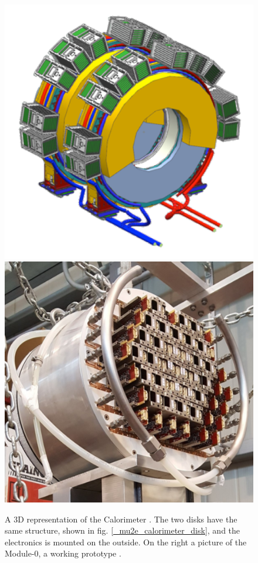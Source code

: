 \documentclass[12pt,a4paper,openright, oneside, titlepage]{book} %
\begin{document}
\begin{figure}[h!]
\centering
\includegraphics[scale=0.5]{mu2e_calorimeter}
\includegraphics[scale=0.7]{mu2e_calorimeter_Module0}
\caption{A 3D representation of the Calorimeter \cite{Calorimeter:2018}. The two disks have the same structure, shown in fig. \ref{_mu2e_calorimeter_disk}, and the electronics is mounted on the outside. On the right a picture of the Module-0, a working prototype \cite{Donghia:2019}.}
\label{_mu2e_calorimeter}
\end{figure}
\end{document}
